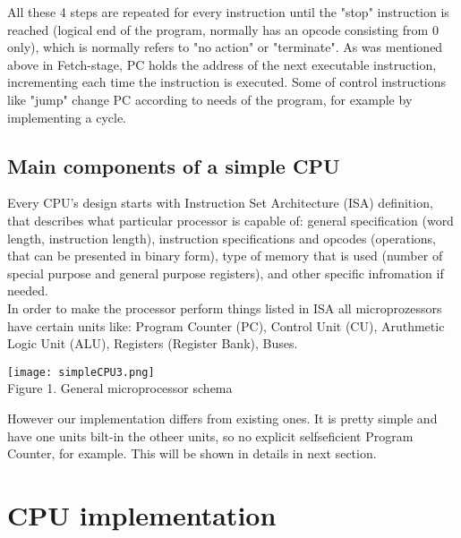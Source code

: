 \documentclass[11pt,a4paper]{article}
\begin{document}
All these 4 steps are repeated for every instruction until the "stop" instruction is reached (logical end of the program, normally has an opcode consisting from 0 only), which is normally refers to "no action" or "terminate". As was mentioned above in Fetch-stage, PC holds the address of the next executable instruction, incrementing each time the instruction is executed. Some of control instructions like "jump" change PC according to needs of the program, for example by implementing a cycle.\\
\subsection{Main components of a simple CPU}
Every CPU's design starts with Instruction Set Architecture (ISA) definition, that describes what particular processor is capable of: general specification (word length, instruction length), instruction specifications and opcodes (operations, that can be presented in binary form), type of memory that is used (number of special purpose and general purpose registers), and other specific infromation if needed. \\
In order to make the processor perform things listed in ISA all microprozessors have certain units like: Program Counter (PC), Control Unit (CU), Aruthmetic Logic Unit (ALU), Registers (Register Bank), Buses.\\
\begin{center}
\texttt{[image: simpleCPU3.png]}\\
Figure 1. General microprocessor schema
\end{center}

However our implementation differs from existing ones. It is pretty simple and have one units bilt-in the otheer units, so no explicit selfseficient Program Counter, for example. This will be shown in details in next section.\\ 

\newpage
\section{CPU implementation}
\end{document}
